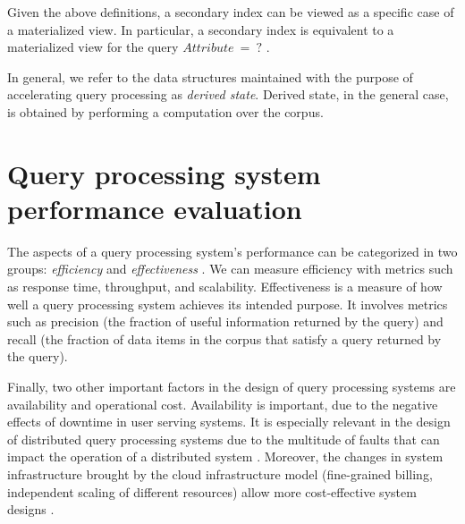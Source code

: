 Given the above definitions,
a secondary index can be viewed as a specific case of a materialized view.
In particular, a secondary index is equivalent to a materialized view for the query $Attribute~=~?$ .

In general, we refer to the data structures maintained with the purpose of accelerating query processing as \textit{derived state}.
Derived state, in the general case, is obtained by performing a computation over the corpus.



\section{Query processing system performance evaluation}
\label{sec:requirements}


The aspects of a query processing system's performance can be categorized in two groups:
\textit{efficiency} and \textit{effectiveness} \cite{buttcher:informationretrieval}.
We can measure efficiency with metrics such as response time, throughput, and scalability.
Effectiveness is a measure of how well a query processing system achieves its intended purpose.
It involves metrics such as precision (the fraction of useful information returned by the query) and recall
(the fraction of data items in the corpus that satisfy a query returned by the query).

Finally, two other important factors in the design of query processing systems are availability and operational cost.
Availability is important, due to the negative effects of downtime in user serving systems.
It is especially relevant in the design of distributed query processing systems due to the multitude of faults that can
impact the operation of a distributed system \cite{kleppmann:designing}.
Moreover, the changes in system infrastructure brought by the cloud infrastructure model
(fine-grained billing, independent scaling of different resources) allow more cost-effective system designs \cite{vuppalapati:elasticqueryengine}.

